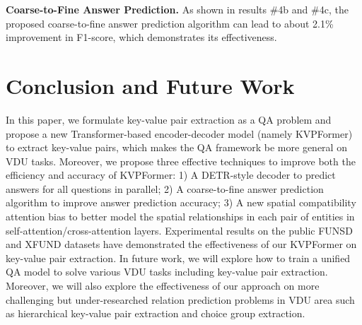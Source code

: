\documentclass[letterpaper]{article} %
\def \Ours {KVPFormer}
\begin{document}
\textbf{Coarse-to-Fine Answer Prediction.} 
As shown in results \#4b and \#4c, the proposed coarse-to-fine answer prediction algorithm can lead to about 2.1\% improvement in F1-score, which demonstrates its effectiveness.

\section{Conclusion and Future Work}
In this paper, we formulate key-value pair extraction as a QA problem and propose a new Transformer-based encoder-decoder model (namely KVPFormer) to extract key-value pairs, which makes the QA framework be more general on VDU tasks. Moreover, we propose three effective techniques to improve both the efficiency and accuracy of KVPFormer: 1) A DETR-style decoder to predict answers for all questions in parallel; 2) A coarse-to-fine answer prediction algorithm to improve answer prediction accuracy; 3) A new spatial compatibility attention bias to better model the spatial relationships in each pair of entities in self-attention/cross-attention layers. Experimental results on the public FUNSD and XFUND datasets have demonstrated the effectiveness of our \Ours{} on key-value pair extraction. In future work, we will explore how to train a unified QA model to solve various VDU tasks including key-value pair extraction. Moreover, we will also explore the effectiveness of our approach on more challenging but under-researched relation prediction problems in VDU area such as hierarchical key-value pair extraction and choice group extraction.


\end{document}
